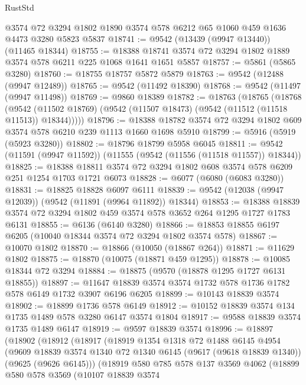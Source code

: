 \begin{lexlean}{RustStd}
\begin{coremodule}
    @3574
    @72
    @3294
    @1802
    @1890
    @3574
    @578
    @6212
    @65
    @1060
    @459
    @1636
    @4473
    @3280
    @5823
    @5837
@18741 := @9542 (@13439 (@9947 @13440)) (@11465 @18344)
@18755 := @18388 @18741 @3574 @72 @3294 @1802 @1889 @3574 @578 @6211 @225 @1068 @1641 @1651 @5857
@18757 := @5861 (@5865 @3280)
@18760 := @18755 @18757 @5872 @5879
@18763 := @9542 (@12488 (@9947 @12489))
@18765 := @9542 (@11492 @18390)
@18768 := @9542 (@11497 (@9947 @11498))
@18769 := @9860 @18389
@18782 := @18763
    (@18765
      (@18768
        (@9542 (@11502 @18769) (@9542 (@11507 @18473) (@9542 (@11512 (@11518 @11513)) @18344)))))
@18796 := @18388 @18782 @3574 @72 @3294 @1802 @609 @3574 @578 @6210 @239 @1113 @1660 @1698 @5910
@18799 := @5916 (@5919 (@5923 @3280))
@18802 := @18796 @18799 @5958 @6045
@18811 := @9542 (@11591 (@9947 @11592)) (@11555 (@9542 (@11556 (@11518 @11557)) @18344))
@18825 := @18388 @18811 @3574 @72 @3294 @1802 @608 @3574 @578 @6209 @251 @1254 @1703 @1721 @6073
@18828 := @6077 (@6080 (@6083 @3280))
@18831 := @18825 @18828 @6097 @6111
@18839 := @9542 (@12038 (@9947 @12039)) (@9542 (@11891 (@9964 @11892)) @18344)
@18853 := @18388 @18839 @3574 @72 @3294 @1802 @459 @3574 @578 @3652 @264 @1295 @1727 @1783 @6131
@18855 := @6136 (@6140 @3280)
@18866 := @18853 @18855 @6197 @6205 (@10040 @18344 @3574 @72 @3294 @1802 @3574 @578)
@18867 := @10070 @1802
@18870 := @18866 (@10050 (@18867 @264))
@18871 := @11629 @1802
@18875 := @18870 (@10075 (@18871 @459 @1295))
@18878 := @10085 @18344 @72 @3294
@18884 := @18875 (@9570 (@18878 @1295 @1727 @6131 @18855))
@18897 := @11647 @18839 @3574 @3574 @1732 @578 @1736 @1782 @578 @6149 @1732 @3907 @6196 @6205
@18899 := @10143 @18839 @3574
@18902 := @18899 @1736 @578 @6149
@18912 := @10152 @18839 @3574 @134 @1735 @1489 @578 @3280 @6147 @3574 @1804
@18917 := @9588 @18839 @3574 @1735 @1489 @6147
@18919 := @9597 @18839 @3574
@18996 := @18897
    (@18902
      (@18912
        (@18917
          (@18919
            @1354
            @1318
            @72
            @1488
            @6145
            @4954
            (@9609
              @18839
              @3574
              @1340
              @72
              @1340
              @6145
              (@9617 (@9618 @18839 @1340))
              (@9625 (@9626 @6145)))
            (@18919
              @580
              @785
              @578
              @137
              @3569
              @4062
              (@18899
                @580
                @578
                @3569
                (@10107
                  @18839
                  @3574

\end{coremodule}
\end{lexlean}
